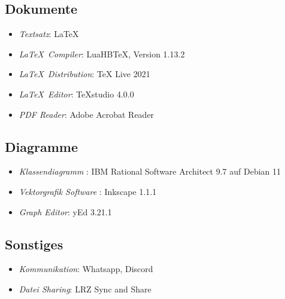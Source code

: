\subsection{Dokumente}
\begin{itemize}
	\item \emph{Textsatz}: \LaTeX {}
	\item \emph{\LaTeX\ Compiler}: LuaHBTeX, Version 1.13.2
	\item \emph{\LaTeX\ Distribution}: TeX Live 2021
	\item \emph{\LaTeX\ Editor}: TeXstudio 4.0.0
	\item \emph{PDF Reader}: Adobe Acrobat Reader
\end{itemize}
\subsection{Diagramme}
\begin{itemize}
	\item \emph{Klassendiagramm }: IBM Rational Software Architect 9.7 auf Debian 11
	\item \emph{Vektorgrafik Software }: Inkscape 1.1.1
	\item \emph{Graph Editor}: yEd 3.21.1
\end{itemize}
\subsection{Sonstiges}
\begin{itemize}
	\item \emph{Kommunikation}: Whatsapp, Discord
	\item \emph{Datei Sharing}: LRZ Sync and Share
\end{itemize}